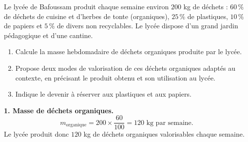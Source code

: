 \documentclass[11pt]{article}
\begin{document}
\begin{exoresolu}
Le lycée de Bafoussam produit chaque semaine environ $200$ kg de déchets : $60\,\%$ de déchets de cuisine et d'herbes de tonte (organiques), $25\,\%$ de plastiques, $10\,\%$ de papiers et $5\,\%$ de divers non recyclables. Le lycée dispose d'un grand jardin pédagogique et d'une cantine.
\begin{enumerate}
\item Calcule la masse hebdomadaire de déchets organiques produite par le lycée.
\item Propose deux modes de valorisation de ces déchets organiques adaptés au contexte, en précisant le produit obtenu et son utilisation au lycée.
\item Indique le devenir à réserver aux plastiques et aux papiers.
\end{enumerate}
\tcblower
\textbf{1. Masse de déchets organiques.}
\[ m_{\text{organique}} = 200 \times \dfrac{60}{100} = 120 \text{ kg par semaine.} \]
Le lycée produit donc $120$ kg de déchets organiques valorisables chaque semaine.


\end{exoresolu}
\end{document}
